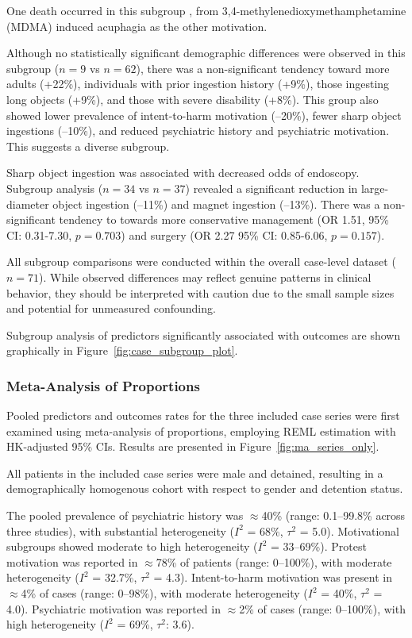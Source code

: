 One death occurred in this subgroup \cite{Emamhadi_2018}, from 3,4-methylenedioxymethamphetamine (MDMA) induced acuphagia as the other motivation.

Although no statistically significant demographic differences were observed in this subgroup ($n = 9$ vs $n = 62$), there was a non-significant tendency toward more adults (+22\%), individuals with prior ingestion history (+9\%), those ingesting long objects (+9\%), and those with severe disability (+8\%). This group also showed lower prevalence of intent-to-harm motivation (–20\%), fewer sharp object ingestions (–10\%), and reduced psychiatric history and psychiatric motivation. This suggests a diverse subgroup.

Sharp object ingestion was associated with decreased odds of endoscopy. Subgroup analysis ($n = 34$ vs $n = 37$) revealed a significant reduction in large-diameter object ingestion (–11\%) and magnet ingestion (–13\%). There was a non-significant tendency to towards more conservative management (OR 1.51, 95\% CI: 0.31-7.30, $p = 0.703$) and surgery (OR 2.27 95\% CI: 0.85-6.06, $p = 0.157$).

All subgroup comparisons were conducted within the overall case-level dataset ($n = 71$). While observed differences may reflect genuine patterns in clinical behavior, they should be interpreted with caution due to the small sample sizes and potential for unmeasured confounding.

Subgroup analysis of predictors significantly associated with outcomes are shown graphically in Figure~\ref{fig:case_subgroup_plot}.

\subsubsection{Meta-Analysis of Proportions}

Pooled predictors and outcomes rates for the three included case series were first examined using meta-analysis of proportions, employing REML estimation with HK-adjusted 95\% CIs. Results are presented in Figure~\ref{fig:ma_series_only}.

All patients in the included case series were male and detained, resulting in a demographically homogenous cohort with respect to gender and detention status.

The pooled prevalence of psychiatric history was $\approx$40\% (range: 0.1--99.8\% across three studies), with substantial heterogeneity ($I^2$ = 68\%, $\tau^2$ = 5.0). Motivational subgroups showed moderate to high heterogeneity ($I^2$ = 33--69\%). Protest motivation was reported in $\approx$78\% of patients (range: 0--100\%), with moderate heterogeneity ($I^2$ = 32.7\%, $\tau^2$ = 4.3). Intent-to-harm motivation was present in $\approx$4\% of cases (range: 0--98\%), with moderate heterogeneity ($I^2$ = 40\%, $\tau^2$ = 4.0). Psychiatric motivation was reported in $\approx$2\% of cases (range: 0--100\%), with high heterogeneity ($I^2$ = 69\%, $\tau^2$: 3.6).

